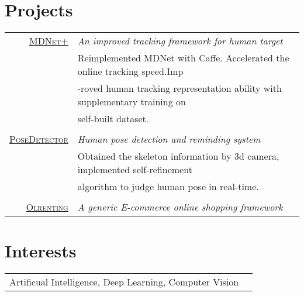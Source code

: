 \documentclass[a4paper,10pt]{article}
\begin{document}
\section{Projects}
\begin{tabular}{rl}	
 \textsc{\href{https://github.com/rao1219/MDNet}{MDNet+}} & \emph{An improved tracking framework for human target}\\
& Reimplemented MDNet with Caffe. Accelerated the online tracking speed.Imp\\
& -roved human tracking representation ability with supplementary training on\\
& self-built dataset.\\
\\

 \textsc{\href{https://github.com/rao1219/intel_cup-3Dcamera}{PoseDetector}} & \emph{Human pose detection and reminding system}\\
& Obtained the skeleton information by 3d camera, implemented self-refinement \\
& algorithm to judge human pose in real-time.\\ 
\\
 \textsc{\href{https://github.com/rao1219/olhandicrafts}{Olrenting}} & \emph{A generic E-commerce online shopping framework}\\
\end{tabular}

\section{Interests}
\begin{tabular}{rl}
Artificual Intelligence, Deep Learning, Computer Vision
\end{tabular}




\end{document}
